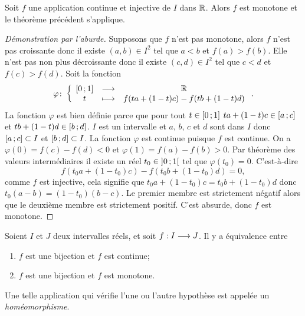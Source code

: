 \begin{theo}
  Soit \(f\) une application continue et injective de \(I\) dans \(\mathbb{R}\). Alors \(f\) est monotone et le théorème précédent s'applique.
\end{theo}
\begin{proof}[Démonstration par l'aburde]
  Supposons que \(f\) n'est pas monotone, alors \(f\) n'est pas croissante donc il existe \((a,b) \in I^2\) tel que \(a < b\) et \(f(a) > f(b)\). Elle n'est pas non plus décroissante donc il existe \((c,d) \in I^2\) tel que \(c < d\) et \(f(c) > f(d)\). Soit la fonction
  \begin{equation}
    \varphi\colon \left\{\begin{array}{ccc} \left[ 0 \, ;  1 \right] & \longrightarrow &\mathbb{R}\\ t & \longmapsto & f(ta+(1-t)c)-f(tb+(1-t)d) \end{array} \right..
  \end{equation}
  La fonction \(\varphi\) est bien définie parce que pour tout \(t \in \left[ 0 \, ;  1 \right]\) \(ta+(1-t)c \in \left[ a \, ;  c \right]\) et \(tb+(1-t)d \in \left[ b \, ;  d \right]\). \(I\) est un intervalle et \(a\), \(b\), \(c\) et \(d\) sont dans \(I\) donc \(\left[ a \, ;  c \right] \subset I\) et \(\left[ b \, ;  d \right] \subset I\). La fonction \(\varphi\) est continue puisque \(f\) est continue. On a \(\varphi(0)=f(c)-f(d) <0\) et \(\varphi(1)=f(a)-f(b) >0\). Par théorème des valeurs intermédiaires il existe un réel \(t_0 \in \left] 0 \, ;  1 \right[\) tel que \(\varphi(t_0)=0\). C'est-à-dire
\begin{equation}
  f(t_0a+(1-t_0)c)-f(t_0b+(1-t_0)d)=0,
\end{equation}
comme \(f\) est injective, cela signifie que \(t_0a+(1-t_0)c=t_0b+(1-t_0)d\) donc \(t_0(a-b)=(1-t_0)(b-c)\). Le premier membre est strictement négatif alors que le deuxième membre est strictement positif. C'est absurde, donc \(f\) est monotone.
\end{proof}
\begin{cor}
  Soient \(I\) et \(J\) deux intervalles réels, et soit \(f:I \longrightarrow J\). Il y a équivalence entre
  \begin{enumerate}
  \item \(f\) est une bijection et \(f\) est continue;
  \item \(f\) est une bijection et \(f\) est monotone.
  \end{enumerate}
  Une telle application qui vérifie l'une ou l'autre hypothèse est appelée un \emph{homéomorphisme}.
\end{cor}
